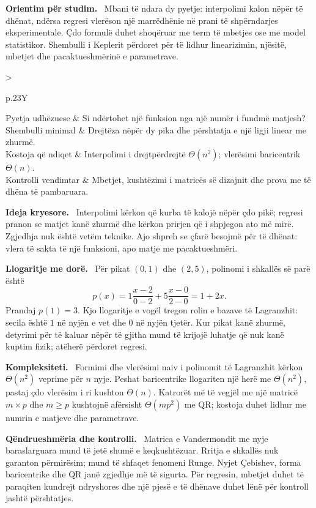 \documentclass[11pt,oneside,openany]{book}
\newenvironment{orientim}{\par\medskip\noindent\textbf{Orientim për studim.}\ }{\par\medskip}
\newenvironment{ideja}{\par\medskip\noindent\textbf{Ideja kryesore.}\ }{\par\medskip}
\newenvironment{llogaritjedore}{\par\medskip\noindent\textbf{Llogaritje me dorë.}\ }{\par\medskip}
\newenvironment{kompleksitet}{\par\medskip\noindent\textbf{Kompleksiteti.}\ }{\par\medskip}
\newenvironment{qendrueshmeri}{\par\medskip\noindent\textbf{Qëndrueshmëria dhe kontrolli.}\ }{\par\medskip}
\newcommand{\hartakapitullit}[4]{%
\par\smallskip
\noindent\begin{tabularx}{\textwidth}{>{\bfseries\raggedright\arraybackslash}p{.23\textwidth}Y}
Pyetja udhëzuese & #1\\
Shembulli minimal & #2\\
Kostoja që ndiqet & #3\\
Kontrolli vendimtar & #4
\end{tabularx}\par\medskip}
\begin{document}
\begin{orientim}
Mbani të ndara dy pyetje: interpolimi kalon nëpër të dhënat, ndërsa regresi
vlerëson një marrëdhënie në prani të shpërndarjes eksperimentale. Çdo formulë
duhet shoqëruar me term të mbetjes ose me model statistikor. Shembulli i
Keplerit përdoret për të lidhur linearizimin, njësitë, mbetjet dhe
pacaktueshmërinë e parametrave.
\end{orientim}

\hartakapitullit
{Si ndërtohet një funksion nga një numër i fundmë matjesh?}
{Drejtëza nëpër dy pika dhe përshtatja e një ligji linear me zhurmë.}
{Interpolimi i drejtpërdrejtë $\Theta(n^2)$; vlerësimi baricentrik $\Theta(n)$.}
{Mbetjet, kushtëzimi i matricës së dizajnit dhe prova me të dhëna të pambaruara.}

\begin{ideja}
Interpolimi kërkon që kurba të kalojë nëpër çdo pikë; regresi pranon se
matjet kanë zhurmë dhe kërkon prirjen që i shpjegon ato më mirë. Zgjedhja nuk
është vetëm teknike. Ajo shpreh se çfarë besojmë për të dhënat: vlera të
sakta të një funksioni, apo matje me pacaktueshmëri.
\end{ideja}

\begin{llogaritjedore}
Për pikat $(0,1)$ dhe $(2,5)$, polinomi i shkallës së parë është
\begin{equation}
 p(x)=1\frac{x-2}{0-2}+5\frac{x-0}{2-0}=1+2x.
\end{equation}
Prandaj $p(1)=3$. Kjo llogaritje e vogël tregon rolin e bazave të Lagranzhit:
secila është $1$ në nyjën e vet dhe $0$ në nyjën tjetër. Kur pikat kanë
zhurmë, detyrimi për të kaluar nëpër të gjitha mund të krijojë luhatje që nuk
kanë kuptim fizik; atëherë përdoret regresi.
\end{llogaritjedore}

\begin{kompleksitet}
Formimi dhe vlerësimi naiv i polinomit të Lagranzhit kërkon
$\Theta(n^2)$ veprime për $n$ nyje. Peshat baricentrike llogariten një herë
me $\Theta(n^2)$, pastaj çdo vlerësim i ri kushton $\Theta(n)$. Katrorët më të
vegjël me një matricë $m\times p$ dhe $m\geq p$ kushtojnë afërsisht
$\Theta(mp^2)$ me QR; kostoja duhet lidhur me numrin e matjeve dhe parametrave.
\end{kompleksitet}

\begin{qendrueshmeri}
Matrica e Vandermondit me nyje baraslarguara mund të jetë shumë e
keqkushtëzuar. Rritja e shkallës nuk garanton përmirësim; mund të shfaqet
fenomeni Runge. Nyjet Çebishev, forma baricentrike dhe QR janë zgjedhje më të
sigurta. Për regresin, mbetjet duhet të paraqiten kundrejt ndryshores dhe një
pjesë e të dhënave duhet lënë për kontroll jashtë përshtatjes.
\end{qendrueshmeri}
\end{document}
